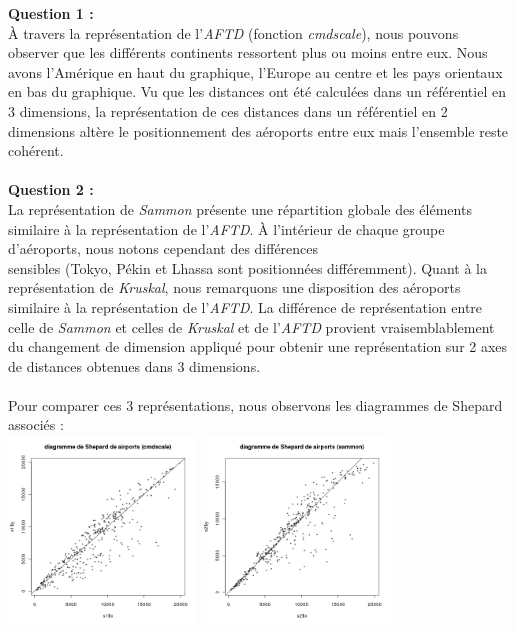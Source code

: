 \documentclass[a4paper, 10pt]{article}
\begin{document}
\textbf{Question 1 :}\\
À travers la représentation de l'\textit{AFTD} (fonction \textit{cmdscale}), nous pouvons observer que les différents continents ressortent plus ou moins
entre eux.
Nous avons l'Amérique en haut du graphique, l'Europe au centre et les pays orientaux en bas du graphique.
Vu que les distances ont été calculées dans un référentiel en 3 dimensions, la représentation de ces distances dans un référentiel en 2 dimensions
altère le positionnement des aéroports entre eux mais l'ensemble reste cohérent.\\ \\
\textbf{Question 2 :}\\
La représentation de \textit{Sammon} présente une répartition globale des éléments similaire à la représentation de l'\textit{AFTD}.
À l'intérieur de chaque groupe d'aéroports, nous notons cependant des différences\\sensibles (Tokyo, Pékin et Lhassa sont positionnées
différemment).
Quant à la représentation de \textit{Kruskal}, nous remarquons une disposition des aéroports similaire à la représentation de l'\textit{AFTD}.
La différence de représentation entre celle de \textit{Sammon} et celles de \textit{Kruskal} et de l'\textit{AFTD} provient vraisemblablement
du changement de dimension appliqué pour obtenir une représentation sur 2 axes de distances obtenues dans 3 dimensions.\\ \\
Pour comparer ces 3 représentations, nous observons les diagrammes de Shepard associés :\\
\includegraphics[height = 5cm, width = 5cm]{plots/plot_airports_shepard_cmdscale.png}
\includegraphics[height = 5cm, width = 5cm]{plots/plot_airports_shepard_sammon.png}
\end{document}

